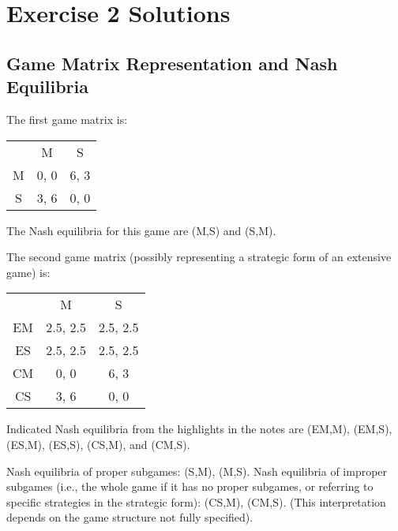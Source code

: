 
\sloppy

\section*{Exercise 2 Solutions}

\subsection*{Game Matrix Representation and Nash Equilibria}

The first game matrix is:
\begin{center}
\begin{tabular}{c|c|c|}
 & \multicolumn{1}{c}{M} & \multicolumn{1}{c}{S} \\ \cline{2-3}
M & 0, 0 & 6, 3 \\ \cline{2-3}
S & 3, 6 & 0, 0 \\ \cline{2-3}
\end{tabular}
\end{center}
The Nash equilibria for this game are (M,S) and (S,M).

The second game matrix (possibly representing a strategic form of an extensive game) is:
\begin{center}
\begin{tabular}{c|c|c|}
 & \multicolumn{1}{c}{M} & \multicolumn{1}{c}{S} \\ \cline{2-3}
EM & 2.5, 2.5 & 2.5, 2.5 \\ \cline{2-3}
ES & 2.5, 2.5 & 2.5, 2.5 \\ \cline{2-3}
CM & 0, 0 & 6, 3 \\ \cline{2-3}
CS & 3, 6 & 0, 0 \\ \cline{2-3}
\end{tabular}
\end{center}
Indicated Nash equilibria from the highlights in the notes are (EM,M), (EM,S), (ES,M), (ES,S), (CS,M), and (CM,S).

Nash equilibria of proper subgames: (S,M), (M,S).
Nash equilibria of improper subgames (i.e., the whole game if it has no proper subgames, or referring to specific strategies in the strategic form): (CS,M), (CM,S). (This interpretation depends on the game structure not fully specified).

